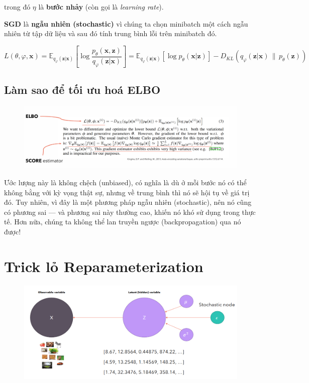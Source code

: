 \documentclass{book}
\begin{document}
trong đó $\eta$ là \textbf{bước nhảy} (còn gọi là \textit{learning rate}).


\textbf{SGD} là \textbf{ngẫu nhiên (stochastic)} vì chúng ta chọn minibatch một cách ngẫu nhiên từ tập dữ liệu và sau đó tính trung bình lỗi trên minibatch đó.

\[
L(\theta, \varphi, \mathbf{x}) = \mathbb{E}_{q_\varphi(\mathbf{z}|\mathbf{x})} \left[ \log \frac{p_\theta(\mathbf{x}, \mathbf{z})}{q_\varphi(\mathbf{z}|\mathbf{x})} \right] 
= \mathbb{E}_{q_\varphi(\mathbf{z}|\mathbf{x})}[\log p_\theta(\mathbf{x}|\mathbf{z})] - D_{KL}\left(q_\varphi(\mathbf{z}|\mathbf{x}) \, \| \, p_\theta(\mathbf{z}) \right)
\]

\subsection{Làm sao để tối ưu hoá ELBO}
\begin{figure}[H]
    \centering
    \includegraphics[width=0.75\linewidth]{images/VAE_kf4.png}
\end{figure}

Ước lượng này là không chệch (unbiased), có nghĩa là dù ở mỗi bước nó có thể không bằng với kỳ vọng thật sự, nhưng về trung bình thì nó sẽ hội tụ về giá trị đó. Tuy nhiên, vì đây là một phương pháp ngẫu nhiên (stochastic), nên nó cũng có phương sai — và phương sai này thường cao, khiến nó khó sử dụng trong thực tế. Hơn nữa, chúng ta không thể lan truyền ngược (backpropagation) qua nó được!


\section{Trick lỏ Reparameterization}
\begin{figure}[H]
    \centering
    \includegraphics[width=0.75\linewidth]{images/VAE_11.png}
\end{figure}
\end{document}
